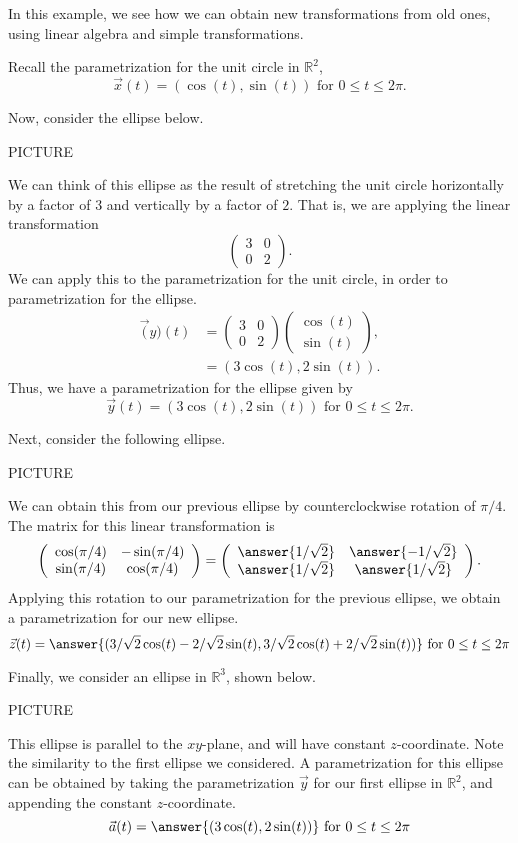 \documentclass{ximera}
\begin{document}
\begin{example}
In this example, we see how we can obtain new transformations from old ones, using linear algebra and simple transformations.

Recall the parametrization for the unit circle in $\mathbb{R}^2$,
\[
\vec{x}(t) = (\cos(t), \sin(t))\textrm{ for }0\leq t\leq 2\pi.
\]

Now, consider the ellipse below.

PICTURE

We can think of this ellipse as the result of stretching the unit circle horizontally by a factor of $3$ and vertically by a factor of $2$. That is, we are applying the linear transformation
\[
\left(\begin{array}{cc}
3 & 0\\
0 & 2
\end{array}\right).
\]
We can apply this to the parametrization for the unit circle, in order to parametrization for the ellipse.
\begin{align*}
\vec(y)(t) &= \left(\begin{array}{cc}
3 & 0\\
0 & 2
\end{array}\right)\left(\begin{array}{c}\cos(t)\\\sin(t)\end{array}\right),\\
&= (3\cos(t), 2\sin(t)).
\end{align*}
Thus, we have a parametrization for the ellipse given by
\[
\vec{y}(t) = (3\cos(t), 2\sin(t))\textrm{ for }0\leq t\leq 2\pi.
\]

Next, consider the following ellipse.

PICTURE

We can obtain this from our previous ellipse by counterclockwise rotation of $\pi/4$. The matrix for this linear transformation is
\[
\left(\begin{array}{cc}
\cos(\pi/4) & -\sin(\pi/4)\\
\sin(\pi/4) & \cos(\pi/4)
\end{array}\right) = 
\left(\begin{array}{cc}
\answer{1/\sqrt{2}} & \answer{-1/\sqrt{2}}\\
\answer{1/\sqrt{2}} & \answer{1/\sqrt{2}}
\end{array}\right).
\]
Applying this rotation to our parametrization for the previous ellipse, we obtain a parametrization for our new ellipse.
\[
\vec{z}(t) = \answer{(3/\sqrt{2}\cos(t) -2/\sqrt{2}\sin(t), 3/\sqrt{2}\cos(t) + 2/\sqrt{2}\sin(t))}\textrm{ for }0\leq t\leq 2\pi
\]

Finally, we consider an ellipse in $\mathbb{R}^3$, shown below.

PICTURE

This ellipse is parallel to the $xy$-plane, and will have constant $z$-coordinate. Note the similarity to the first ellipse we considered. A parametrization for this ellipse can be obtained by taking the parametrization $\vec{y}$ for our first ellipse in $\mathbb{R}^2$, and appending the constant $z$-coordinate.
\[
\vec{a}(t) = \answer{(3\cos(t), 2\sin(t))}\textrm{ for }0\leq t\leq 2\pi
\]
\end{example}
\end{document}
